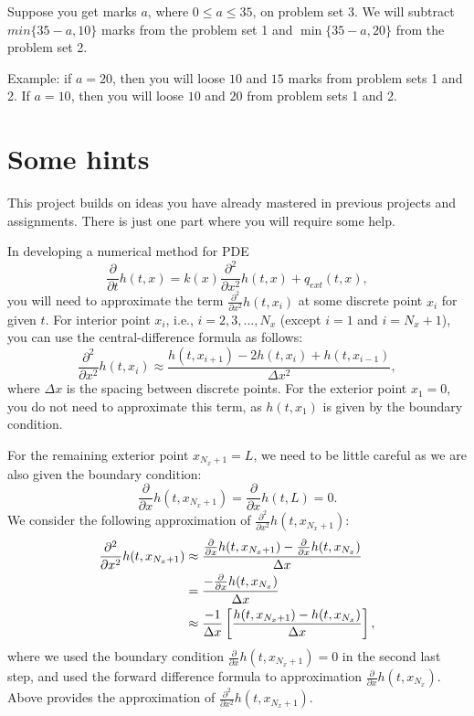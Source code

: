 \documentclass[11pt,a4paper]{article}
\newcommand{\p}{\partial }
\begin{document}
Suppose you get marks $a$, where $0 \leq a \leq 35$, on problem set 3. We will subtract $min\{35 - a, 10\}$ marks from the problem set 1 and $\min\{35 - a, 20\}$ from the problem set 2. 

Example: if $a = 20$, then you will loose $10$ and $15$ marks from problem sets 1 and 2. If $ a = 10$, then you will loose $10$ and $20$ from problem sets 1 and 2.

\section{Some hints}
This project builds on ideas you have already mastered in previous projects and assignments. There is just one part where you will require some help. 

In developing a numerical method for PDE
\begin{equation}\label{eq:pdeHelp}
\frac{\p}{\p t} h(t, x) = k(x) \frac{\p^2 }{\p x^2} h(t, x) + q_{ext}(t, x),
\end{equation}
you will need to approximate the term  $\frac{\p^2 }{\p x^2} h(t, x_i)$ at some discrete point $x_i$ for given $t$. For interior point $x_i$, i.e., $i=2, 3, ..., N_x$ (except $i=1$ and $i=N_x + 1$), you can use the central-difference formula as follows:
\begin{equation}
\frac{\p^2 }{\p x^2} h(t, x_i) \approx \frac{h(t, x_{i+1}) - 2h(t, x_i) + h(t, x_{i-1})}{\Delta x^2},
\end{equation}
where $\Delta x$ is the spacing between discrete points. For the exterior point $x_1 = 0$, you do not need to approximate this term, as $h(t, x_1)$ is given by the boundary condition. 

For the remaining exterior point $x_{N_x + 1} = L$, we need to be little careful as we are also given the boundary condition: 
\begin{equation}
\frac{\p }{\p x} h(t, x_{N_x + 1}) = \frac{\p }{\p x} h(t, L) = 0.
\end{equation}
We consider the following approximation of $\frac{\p^2 }{\p x^2} h(t, x_{N_x + 1})$:
\begin{align}
\frac{\p^2 }{\p x^2} h(t, x_{N_x + 1}) &\approx \frac{\frac{\p }{\p x} h(t, x_{N_x + 1}) - \frac{\p }{\p x} h(t, x_{N_x})}{\Delta x} \notag \\
&= \frac{ - \frac{\p }{\p x} h(t, x_{N_x})}{\Delta x} \notag \\
&\approx \frac{-1}{\Delta x} \left[ \frac{h(t, x_{N_x + 1}) - h(t, x_{N_x})}{\Delta x} \right],
\end{align}
where we used the boundary condition $\frac{\p }{\p x} h(t, x_{N_x + 1}) = 0$ in the second last step, and used the forward difference formula to approximation $ \frac{\p }{\p x} h(t, x_{N_x})$. Above provides the approximation of $\frac{\p^2 }{\p x^2} h(t, x_{N_x + 1})$. 
\end{document}
